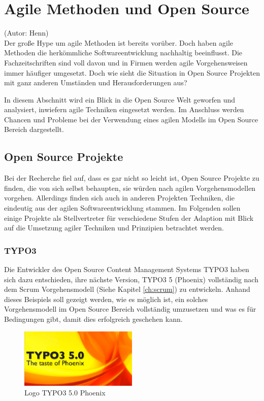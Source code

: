 \section{Agile Methoden und Open Source}
(Autor: Henn)\\

Der große Hype um agile Methoden ist bereits vorüber. Doch haben agile Methoden die herkömmliche Softwareentwicklung nachhaltig beeinflusst. Die Fachzeitschriften sind voll davon und in Firmen werden agile Vorgehensweisen immer häufiger umgesetzt. Doch wie sieht die Situation in Open Source Projekten mit ganz anderen Umständen und Herausforderungen aus?

In diesem Abschnitt wird ein Blick in die Open Source Welt geworfen und analysiert, inwiefern agile Techniken eingesetzt werden. Im Anschluss werden Chancen und Probleme bei der Verwendung eines agilen Modells im Open Source Bereich dargestellt.

\subsection{Open Source Projekte}
Bei der Recherche fiel auf, dass es gar nicht so leicht ist, Open Source Projekte zu finden, die von sich selbst behaupten, sie würden nach agilen Vorgehensmodellen vorgehen. Allerdings finden sich auch in anderen Projekten Techniken, die eindeutig aus der agilen Softwareentwicklung stammen. Im Folgenden sollen einige Projekte als Stellvertreter für verschiedene Stufen der Adaption mit Blick auf die Umsetzung agiler Techniken und Prinzipien betrachtet werden.

\subsubsection{TYPO3}
Die Entwickler des Open Source Content Management Systems TYPO3 haben sich dazu entschieden, ihre nächste Version, TYPO3 5 (Phoenix) vollständig nach dem Scrum Vorgehensmodell  (Siehe Kapitel \ref{ch:scrum}) zu entwickeln. Anhand dieses Beispiels soll gezeigt werden, wie es möglich ist, ein solches Vorgehensmodell im Open Source Bereich vollständig umzusetzen und was es für Bedingungen gibt, damit dies erfolgreich geschehen kann.
\begin{figure}[h]
	\centering
	\includegraphics[width=0.5\textwidth]{images/typo3_Phoenix_logo.jpg}
	\caption{Logo TYPO3 5.0 Phoenix\cite{bib:phoenix-logo}}
	\label{Logo-Phoenix}
\end{figure}

